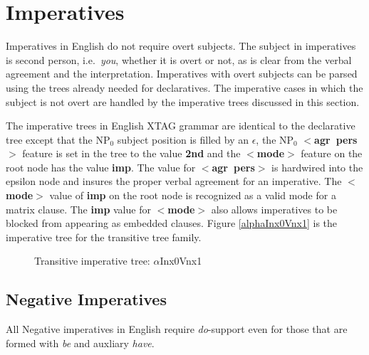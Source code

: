 
\chapter{Imperatives}
\label{imperatives}



Imperatives in English do not require overt subjects.  The subject in
imperatives is second person, i.e.\ {\it you}, whether it is overt or
not, as is clear from the verbal agreement and the interpretation.
Imperatives with overt subjects can be  parsed using the trees already
needed for declaratives.  The imperative cases in which the subject is
not overt are handled by the imperative trees discussed in this section.

The imperative trees in English XTAG grammar are identical to the declarative
tree except that the NP$_{0}$ subject position is filled by an $\epsilon$, the
NP$_{0}$ {\bf $<$agr~pers$>$} feature is set in the tree to the value {\bf 2nd}
and the {\bf $<$mode$>$} feature on the root node has the value {\bf imp}.  The
value for {\bf $<$agr~pers$>$} is hardwired into the epsilon node and insures
the proper verbal agreement for an imperative.  The {\bf $<$mode$>$} value of
{\bf imp} on the root node is recognized as a valid mode for a matrix clause.
The {\bf imp} value for {\bf $<$mode$>$} also allows imperatives to be blocked
from appearing as embedded clauses.  Figure \ref{alphaInx0Vnx1} is the
imperative tree for the transitive tree family.

\begin{figure}[htbp]
\caption{Transitive imperative tree: $\alpha$Inx0Vnx1}
\label{alphaInx0Vnx1}
\label{2;11,1}
\end{figure}

\section{Negative Imperatives}
\label{neg-imp}

All Negative imperatives in English require {\it do}-support even for those
that are formed with {\it be} and auxliary {\it have}.



